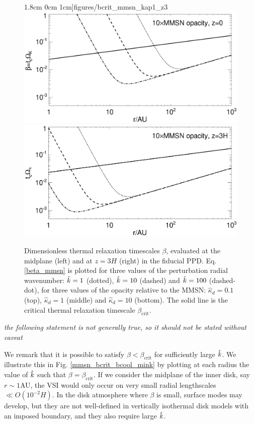 \begin{figure}
  1.8cm 0cm 1cm]{figures/bcrit_mmsn_kap1_z3}\\
  \includegraphics[scale=.47,clip=true,trim=0cm 0cm 0cm
  1cm]{figures/bcrit_mmsn_kap10_z0}\includegraphics[scale=.47,clip=true,trim=2.5cm 0cm 0cm
  1cm]{figures/bcrit_mmsn_kap10_z3} 
  \caption{Dimensionless thermal relaxation timescales $\beta$,
    evaluated at the midplane (left) and at $z=3H$ (right) in the
    fiducial PPD. Eq. \ref{beta_mmsn} is plotted  
    for three values of the 
    perturbation radial wavenumber: $\hat{k}=1$ (dotted), $\hat{k}=10$
    (dashed) and $\hat{k}=100$ (dashed-dot), for three values of the
    opacity relative to the MMSN: $\hat{\kappa}_d=0.1$ (top),
    $\hat{\kappa}_d=1$ (middle) and $\hat{\kappa}_d=10$ (bottom).  
    The solid line is the 
    critical thermal relaxation timescale $\beta_\mathrm{crit}$.  
    \label{mmsn_bcrit_bcool}}   
\end{figure}  

\emph{the following statement is not generally true, so it should not be stated without caveat}

We remark that it is possible to satisfy $\beta < \beta_\mathrm{crit}$ 
for sufficiently large $\hat{k}$. We illustrate this in 
Fig. \ref{mmsn_bcrit_bcool_mink} by plotting at each radius the value
of $\hat{k}$ such that $\beta = \beta_\mathrm{crit}$. If we consider the
midplane of the inner disk, say $r\sim 1$AU, the VSI would only occur
on very small radial lengthscales $\ll O(10^{-2}H)$. In the disk
atmosphere where $\beta$ is small, surface modes may develop, 
but they are not well-defined in vertically isothermal disk models
with an imposed boundary, and they also require large $\hat{k}$.    

